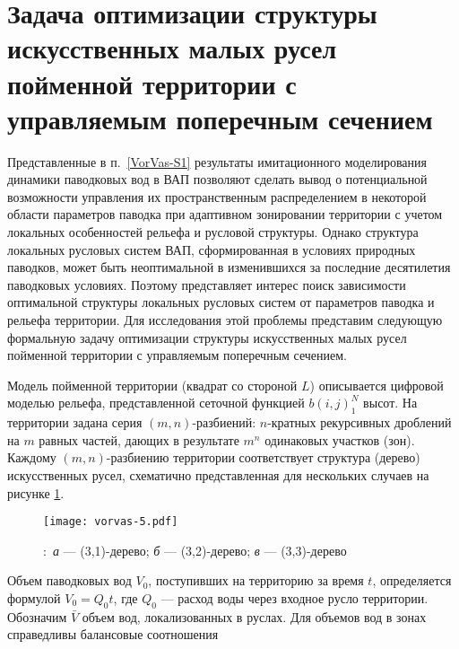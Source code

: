 \section{Задача оптимизации структуры искусственных малых русел\\ пойменной территории с управляемым поперечным сечением}\label{VorVas-S2}

Представленные в п.~\ref{VorVas-S1} результаты имитационного моделирования динамики паводковых вод в ВАП позволяют сделать вывод о потенциальной возможности управления их пространственным распределением в некоторой области параметров паводка при  адаптивном зонировании территории с учетом локальных особенностей рельефа и русловой структуры. Однако структура локальных русловых систем ВАП, сформированная в условиях природных паводков, может быть неоптимальной в изменившихся за последние десятилетия паводковых условиях. Поэтому представляет интерес поиск зависимости оптимальной структуры локальных русловых систем от  параметров паводка и рельефа территории. Для исследования этой проблемы представим следующую формальную задачу оптимизации структуры искусственных малых русел пойменной территории с управляемым поперечным сечением.

Модель пойменной территории (квадрат со стороной $L$) описывается цифровой моделью рельефа, представленной сеточной функцией $b(i,j)_1^N$ высот. На территории задана серия $(m,n)$-разбиений:  $n$-кратных рекурсивных дроблений на $m$  равных частей, дающих в результате $m^n$ одинаковых участков (зон). Каждому  $(m,n)$-разбиению территории соответствует  структура (дерево) искусственных русел, схематично представленная для нескольких случаев на рисунке \ref{ris:vorvas-5}.

 \begin{figure}[h!]
 \begin{center}
 \begin{minipage}{.85\linewidth}
 \texttt{[image: vorvas-5.pdf]}
 \caption{\!\!\!\!:\ \emph{а} --- (3,1)-дерево; \emph{б} --- (3,2)-дерево; \emph{в} --- (3,3)-дерево}
 \label{ris:vorvas-5}\end{minipage}
 \end{center}
 \end{figure}


Объем паводковых вод  $V_0$, поступивших на территорию за время  $t$, определяется формулой $V_0=Q_0 t$,  где  $Q_0$    --- расход воды через входное русло территории.
Обозначим  $\bar{V}$  объем вод, локализованных в руслах.  Для объемов вод в зонах справедливы балансовые соотношения

